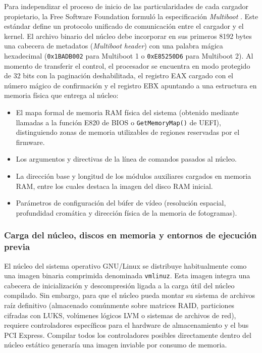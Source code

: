 \documentclass[12pt]{article}
\begin{document}
Para independizar el proceso de inicio de las particularidades de cada cargador propietario, la Free Software Foundation formuló la especificación \textit{Multiboot} \parencite{fsf2024multiboot}. Este estándar define un protocolo unificado de comunicación entre el cargador y el kernel. El archivo binario del núcleo debe incorporar en sus primeros 8192 bytes una cabecera de metadatos (\textit{Multiboot header}) con una palabra mágica hexadecimal (\texttt{0x1BADB002} para Multiboot 1 o \texttt{0xE85250D6} para Multiboot 2). Al momento de transferir el control, el procesador se encuentra en modo protegido de 32 bits con la paginación deshabilitada, el registro EAX cargado con el número mágico de confirmación y el registro EBX apuntando a una estructura en memoria física que entrega al núcleo:
\begin{itemize}[noitemsep, topsep=1pt]
    \item El mapa formal de memoria RAM física del sistema (obtenido mediante llamadas a la función E820 de BIOS o \texttt{GetMemoryMap()} de UEFI), distinguiendo zonas de memoria utilizables de regiones reservadas por el firmware.
    \item Los argumentos y directivas de la línea de comandos pasados al núcleo.
    \item La dirección base y longitud de los módulos auxiliares cargados en memoria RAM, entre los cuales destaca la imagen del disco RAM inicial.
    \item Parámetros de configuración del búfer de vídeo (resolución espacial, profundidad cromática y dirección física de la memoria de fotogramas).
\end{itemize}

\subsubsection{Carga del núcleo, discos en memoria y entornos de ejecución previa}

El núcleo del sistema operativo GNU/Linux se distribuye habitualmente como una imagen binaria comprimida denominada \texttt{vmlinuz}. Esta imagen integra una cabecera de inicialización y descompresión ligada a la carga útil del núcleo compilado. Sin embargo, para que el núcleo pueda montar su sistema de archivos raíz definitivo (almacenado comúnmente sobre matrices RAID, particiones cifradas con LUKS, volúmenes lógicos LVM o sistemas de archivos de red), requiere controladores específicos para el hardware de almacenamiento y el bus PCI Express. Compilar todos los controladores posibles directamente dentro del núcleo estático generaría una imagen inviable por consumo de memoria.
\end{document}
